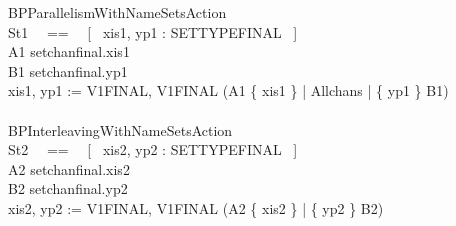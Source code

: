 \begin{circus}


 \circprocess BPParallelismWithNameSetsAction \circdef \circbegin \\
    \circstate St1 ~~==~~ [~ xis1, yp1 : SETTYPEFINAL ~] \\
    A1 \circdef %
      setchanfinal.xis1 \then \Skip \\
    B1 \circdef %
      setchanfinal.yp1 \then \Skip \\
    \circspot xis1, yp1 := V1FINAL, V1FINAL \circseq (A1 \lpar \{ xis1 \} | Allchans | \{ yp1 \} \rpar B1) \\
 \circend \\

 \circprocess BPInterleavingWithNameSetsAction \circdef \circbegin \\
    \circstate St2 ~~==~~ [~ xis2, yp2 : SETTYPEFINAL ~] \\
    A2 \circdef %
      setchanfinal.xis2 \then \Skip \\
    B2 \circdef %
      setchanfinal.yp2 \then \Skip \\
    \circspot xis2, yp2 := V1FINAL, V1FINAL \circseq (A2 \linter \{ xis2 \} | \{ yp2 \} \rinter B2) \\
 \circend \\


\end{circus}
